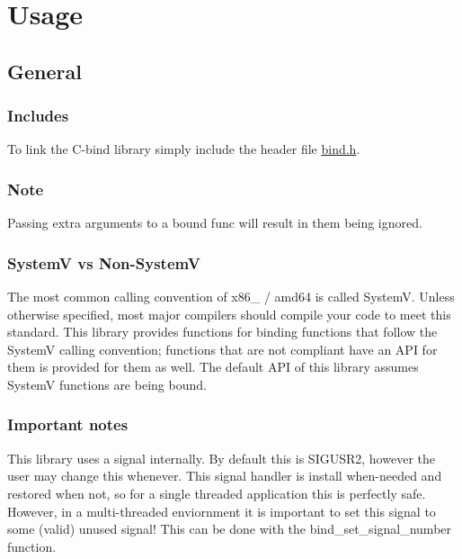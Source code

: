 \section*{Usage}

\subsection*{General}

\subsubsection*{Includes}

To link the {\ttfamily C-\/bind} library simply include the header file {\ttfamily \hyperlink{bind_8h}{bind.\+h}}.

\subsubsection*{Note}

Passing extra arguments to a bound func will result in them being ignored.

\subsubsection*{SystemV vs Non-\/\+SystemV}

The most common calling convention of {\ttfamily x86\+\_} / {\ttfamily amd64} is called SystemV. Unless otherwise specified, most major compilers should compile your code to meet this standard. This library provides functions for binding functions that follow the SystemV calling convention; functions that are not compliant have an A\+PI for them is provided for them as well. The default A\+PI of this library assumes SystemV functions are being bound.

\subsubsection*{Important notes}


\begin{DoxyEnumerate}
\item This library uses a signal internally. By default this is {\ttfamily S\+I\+G\+U\+S\+R2}, however the user may change this whenever. This signal handler is install when-\/needed and restored when not, so for a single threaded application this is perfectly safe. However, in a multi-\/threaded enviornment it is important to set this signal to some (valid) unused signal! This can be done with the {\ttfamily bind\+\_\+set\+\_\+signal\+\_\+number} function.
\end{DoxyEnumerate}

